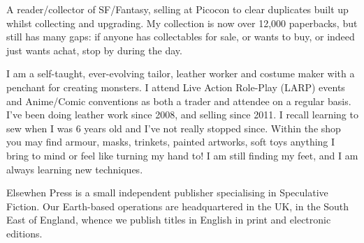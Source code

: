 A reader/collector of SF/Fantasy, selling at Picocon to
clear duplicates built up whilst collecting and upgrading. My
collection is now over 12,000 paperbacks, but still has many gaps: if
anyone has collectables for sale, or wants to buy, or indeed just
wants achat, stop by during the day.

I am a self-taught, ever-evolving tailor, leather worker and costume
maker with a penchant for creating monsters. I attend Live Action
Role-Play (LARP) events and Anime/Comic conventions as both a trader
and attendee on a regular basis. I’ve been doing leather work since
2008, and selling since 2011. I recall learning to sew when I was 6
years old and I’ve not really stopped since. Within the shop you may
find armour, masks, trinkets, painted artworks, soft toys
\textellipsis anything I bring to mind or feel like turning my hand
to! I am still finding my feet, and I am always learning new
techniques.

Elsewhen Press is a small independent publisher specialising in Speculative Fiction. Our Earth-based operations are headquartered in the UK, in the South East of England, whence we publish titles in English in print and electronic editions.
